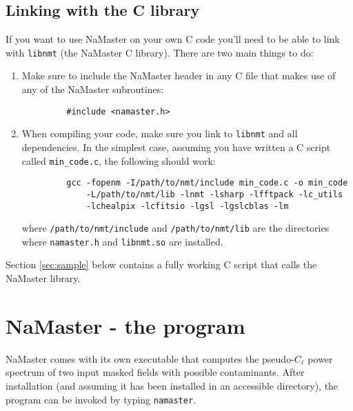 \documentclass[a4paper,10pt]{article}
\begin{document}
\subsection*{Linking with the C library}
If you want to use NaMaster on your own C code you'll need to be able to link with {\tt libnmt} (the NaMaster C library). There are two main things to do:
\begin{enumerate}
 \item Make sure to include the NaMaster header in any C file that makes use of any of the NaMaster subroutines:
       \begin{verbatim}
         #include <namaster.h>
       \end{verbatim}
 \item When compiling your code, make sure you link to {\tt libnmt} and all dependencies. In the simplest case, assuming you have written a C script called {\tt min\_code.c}, the following should work:
       \begin{verbatim}
         gcc -fopenm -I/path/to/nmt/include min_code.c -o min_code
             -L/path/to/nmt/lib -lnmt -lsharp -lfftpack -lc_utils
             -lchealpix -lcfitsio -lgsl -lgslcblas -lm
       \end{verbatim}
       where {\tt /path/to/nmt/include} and {\tt /path/to/nmt/lib} are the directories where {\tt namaster.h} and {\tt libnmt.so} are installed.
\end{enumerate}
Section \ref{sec:sample} below contains a fully working C script that calls the NaMaster library.

\section{NaMaster - the program}
NaMaster comes with its own executable that computes the pseudo-$C_\ell$ power spectrum of two input masked fields with possible contaminants. After installation (and assuming it has been installed in an accessible directory), the program can be invoked by typing {\tt namaster}.
\end{document}
